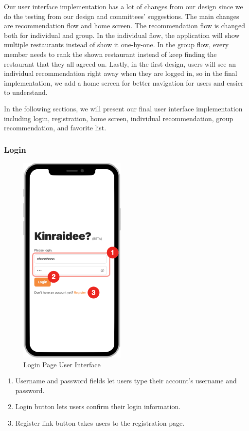 \documentclass[12pt,oneside,openright,a4paper]{cpe-english-project}
\begin{document}
Our user interface implementation has a lot of changes from our design since we do the testing from our design and committees’ suggestions. The main changes are recommendation flow and home screen. The recommendation flow is changed both for individual and group. In the individual flow, the application will show multiple restaurants instead of show it one-by-one. In the group flow, every member needs to rank the shown restaurant instead of keep finding the restaurant that they all agreed on. Lastly, in the first design, users will see an individual recommendation right away when they are logged in, so in the final implementation, we add a home screen for better navigation for users and easier to understand.

In the following sections, we will present our final user interface implementation including login, registration, home screen, individual recommendation, group recommendation, and favorite list.


\newpage
\subsubsection{Login}
\begin{figure}[H]\centering
\includegraphics[height=300pt]{./images/4ui_LoginPageUserInterface.png}
\caption{Login Page User Interface}\label{fig:4ui_LoginPageUserInterface}
\end{figure}\vspace{-24pt}

\begin{enumerate}
\item Username and password fields let users type their account’s username and password.
\item Login button lets users confirm their login information.
\item Register link button takes users to the registration page.
\end{enumerate}
\end{document}
